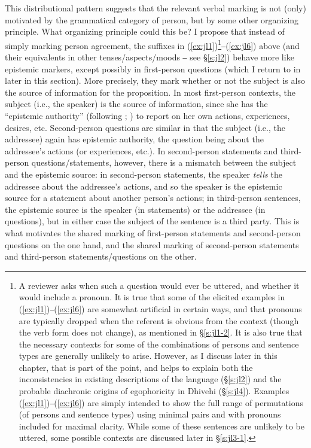 \documentclass[output=paper]{langsci/langscibook}
\begin{document}
This distributional pattern suggests that the relevant verbal marking is not (only) motivated by the grammatical category of person, but by some other organizing principle. What organizing principle could this be? I propose that instead of simply marking person agreement, the suffixes in (\ref{ex:jl1})\footnote{A reviewer asks when such a question would ever be uttered, and whether it would include a pronoun. It is true that some of the elicited examples in (\ref{ex:jl1})‒(\ref{ex:jl6}) are somewhat artificial in certain ways, and that pronouns are typically dropped when the referent is obvious from the context (though the verb form does not change), as mentioned in §\ref{s:jl1-2}. It is also true that the necessary contexts for some of the combinations of persons and sentence types are generally unlikely to arise. However, as I discuss later in this chapter, that is part of the point, and helps to explain both the inconsistencies in existing descriptions of the language (§\ref{s:jl2}) and the probable diachronic origins of egophoricity in Dhivehi (§\ref{s:jl4}). Examples (\ref{ex:jl1})‒(\ref{ex:jl6}) are simply intended to show the full range of permutations (of persons and sentence types) using minimal pairs and with pronouns included for maximal clarity. While some of these sentences are unlikely to be uttered, some possible contexts are discussed later in §\ref{s:jl3-1}.}‒(\ref{ex:jl6}) above (and their equivalents in other tenses/aspects/moods ‒ see §\ref{s:jl2}) behave more like epistemic markers, except possibly in first-person questions (which I return to in later in this section). More precisely, they mark whether or not the subject is also the source of information for the proposition. In most first-person contexts, the subject (i.e., the speaker) is the source of information, since she has the “epistemic authority” (following \citealt{Hargreaves1991}; \citeyear{Hargreaves2005}) to report on her own actions, experiences, desires, etc. Second-person questions are similar in that the subject (i.e., the addressee) again has epistemic authority, the question being about the addressee’s actions (or experiences, etc.). In second-person statements and third-person questions/statements, however, there is a mismatch between the subject and the epistemic source: in second-person statements, the speaker \textit{tells} the addressee about the addressee’s actions, and so the speaker is the epistemic source for a statement about another person’s actions; in third-person sentences, the epistemic source is the speaker (in statements) or the addressee (in questions), but in either case the subject of the sentence is a third party. This is what motivates the shared marking of first-person statements and second-person questions on the one hand, and the shared marking of second-person statements and third-person statements/questions on the other.
\end{document}
